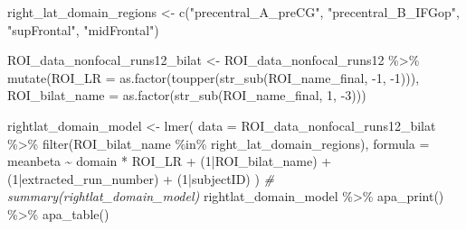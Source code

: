 \documentclass[
]{article}
\newenvironment{Shaded}{\begin{snugshade}}{\end{snugshade}}
\newcommand{\AttributeTok}[1]{\textcolor[rgb]{0.77,0.63,0.00}{#1}}
\newcommand{\CommentTok}[1]{\textcolor[rgb]{0.56,0.35,0.01}{\textit{#1}}}
\newcommand{\DecValTok}[1]{\textcolor[rgb]{0.00,0.00,0.81}{#1}}
\newcommand{\FunctionTok}[1]{\textcolor[rgb]{0.00,0.00,0.00}{#1}}
\newcommand{\NormalTok}[1]{#1}
\newcommand{\OtherTok}[1]{\textcolor[rgb]{0.56,0.35,0.01}{#1}}
\newcommand{\SpecialCharTok}[1]{\textcolor[rgb]{0.00,0.00,0.00}{#1}}
\newcommand{\StringTok}[1]{\textcolor[rgb]{0.31,0.60,0.02}{#1}}
\begin{document}
\begin{Shaded}
\begin{Highlighting}[]
\NormalTok{right\_lat\_domain\_regions }\OtherTok{\textless{}{-}} \FunctionTok{c}\NormalTok{(}\StringTok{"precentral\_A\_preCG"}\NormalTok{, }
                       \StringTok{"precentral\_B\_IFGop"}\NormalTok{,}
                       \StringTok{"supFrontal"}\NormalTok{,}
                       \StringTok{"midFrontal"}\NormalTok{)}

\NormalTok{ROI\_data\_nonfocal\_runs12\_bilat }\OtherTok{\textless{}{-}}\NormalTok{ ROI\_data\_nonfocal\_runs12 }\SpecialCharTok{\%\textgreater{}\%}
  \FunctionTok{mutate}\NormalTok{(}\AttributeTok{ROI\_LR =} \FunctionTok{as.factor}\NormalTok{(}\FunctionTok{toupper}\NormalTok{(}\FunctionTok{str\_sub}\NormalTok{(ROI\_name\_final, }\SpecialCharTok{{-}}\DecValTok{1}\NormalTok{, }\SpecialCharTok{{-}}\DecValTok{1}\NormalTok{))),}
         \AttributeTok{ROI\_bilat\_name =} \FunctionTok{as.factor}\NormalTok{(}\FunctionTok{str\_sub}\NormalTok{(ROI\_name\_final, }\DecValTok{1}\NormalTok{, }\SpecialCharTok{{-}}\DecValTok{3}\NormalTok{)))}

\NormalTok{rightlat\_domain\_model }\OtherTok{\textless{}{-}} \FunctionTok{lmer}\NormalTok{(}
      \AttributeTok{data =}\NormalTok{ ROI\_data\_nonfocal\_runs12\_bilat }\SpecialCharTok{\%\textgreater{}\%}
        \FunctionTok{filter}\NormalTok{(ROI\_bilat\_name }\SpecialCharTok{\%in\%}\NormalTok{ right\_lat\_domain\_regions),}
      \AttributeTok{formula =}\NormalTok{ meanbeta }\SpecialCharTok{\textasciitilde{}}\NormalTok{ domain }\SpecialCharTok{*}\NormalTok{ ROI\_LR }\SpecialCharTok{+}\NormalTok{ (}\DecValTok{1}\SpecialCharTok{|}\NormalTok{ROI\_bilat\_name) }\SpecialCharTok{+}\NormalTok{ (}\DecValTok{1}\SpecialCharTok{|}\NormalTok{extracted\_run\_number) }\SpecialCharTok{+}\NormalTok{ (}\DecValTok{1}\SpecialCharTok{|}\NormalTok{subjectID)}
\NormalTok{    )}
\CommentTok{\# summary(rightlat\_domain\_model)}
\NormalTok{rightlat\_domain\_model }\SpecialCharTok{\%\textgreater{}\%}
  \FunctionTok{apa\_print}\NormalTok{() }\SpecialCharTok{\%\textgreater{}\%}
  \FunctionTok{apa\_table}\NormalTok{()}
\end{Highlighting}
\end{Shaded}
\end{document}
